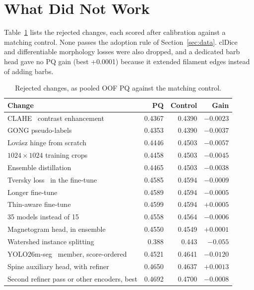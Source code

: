 \documentclass[sigconf,pbalance]{acmart}
\begin{document}
\section{What Did Not Work}\label{sec:negative}
    \small
    Table~\ref{tab:negative} lists the rejected changes, each scored after calibration against a matching control.
    None passes the adoption rule of Section~\ref{sec:data}.
    clDice~\cite{shit2021cldice} and differentiable morphology losses were also dropped, and a dedicated barb head gave no PQ gain (best +0.0001) because it extended filament edges instead of adding barbs.

    \begin{table}[t]
        \caption{Rejected changes, as pooled OOF PQ against the matching control.}\label{tab:negative}
        \footnotesize
        \begin{tabular}{lrrr}
            \toprule
            Change & PQ & Control & Gain \\
            \midrule
            CLAHE~\cite{zuiderveld1994clahe} contrast enhancement & 0.4367 & 0.4390 & $-0.0023$ \\
            GONG pseudo-labels & 0.4353 & 0.4390 & $-0.0037$ \\
            Lovász hinge from scratch & 0.4446 & 0.4503 & $-0.0057$ \\
            $1024\times1024$ training crops & 0.4458 & 0.4503 & $-0.0045$ \\
            Ensemble distillation & 0.4465 & 0.4503 & $-0.0038$ \\
            Tversky loss~\cite{salehi2017tversky} in the fine-tune & 0.4585 & 0.4594 & $-0.0009$ \\
            Longer fine-tune & 0.4589 & 0.4594 & $-0.0005$ \\
            Thin-aware fine-tune & 0.4599 & 0.4594 & $+0.0005$ \\
            35 models instead of 15 & 0.4558 & 0.4564 & $-0.0006$ \\
            Magnetogram head, in ensemble & 0.4550 & 0.4549 & $+0.0001$ \\
            Watershed instance splitting & 0.388 & 0.443 & $-0.055$ \\
            YOLO26m-seg~\cite{jocher2026yolo26} member, score-ordered & 0.4521 & 0.4641 & $-0.0120$ \\
            Spine auxiliary head, with refiner & 0.4650 & 0.4637 & $+0.0013$ \\
            Second refiner pass or other encoders, best & 0.4692 & 0.4700 & $-0.0008$ \\
            \bottomrule
        \end{tabular}
    \end{table}
\end{document}
